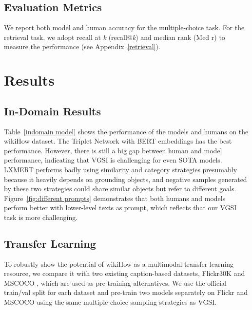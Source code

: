 \documentclass[11pt]{article}
\begin{document}
\subsection{Evaluation Metrics}
We report both model and human accuracy for the multiple-choice task. For the retrieval task, we adopt recall at \textit{k} (recall@\textit{k}) and median rank (Med r) to measure the performance (see Appendix~\ref{retrieval}).

\section{Results}
\subsection{In-Domain Results}
Table~\ref{indomain model} shows the performance of the models and humans on the wikiHow dataset. The Triplet Network with BERT embeddings has the best performance. However, there is still a big gap between human and model performance, indicating that VGSI is challenging for even SOTA models. LXMERT performs badly using similarity and category strategies presumably because it heavily depends on grounding objects, and negative samples generated by these two strategies could share similar objects but refer to different goals. Figure~\ref{fig:different prompts} demonstrates that both humans and models perform better with lower-level texts as prompt, which reflects that our VGSI task is more challenging.

\subsection{Transfer Learning}
To robustly show the potential of wikiHow as a multimodal transfer learning resource, we compare it with two existing caption-based datasets, Flickr30K \cite{Plummer_2015_ICCV} and MSCOCO \cite{vinyals2016show}, which are used as pre-training alternatives. We use the official train/val split for each dataset and pre-train two models separately on Flickr and MSCOCO using the same multiple-choice sampling strategies as VGSI.
\end{document}
